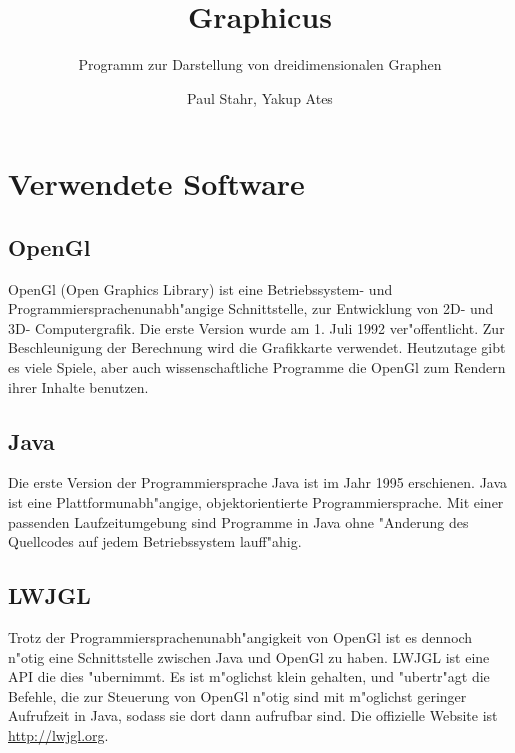 \documentclass{scrartcl}
\title{Graphicus}
\author{Paul Stahr, Yakup Ates}
\subtitle{Programm zur Darstellung von dreidimensionalen Graphen}
\begin{document}
\maketitle
\newpage

\tableofcontents
\newpage
\section{Verwendete Software}
\subsection{OpenGl}
OpenGl (Open Graphics Library) ist eine Betriebssystem- und Programmiersprachenunabh"angige Schnittstelle, zur Entwicklung von 2D- und 3D- Computergrafik. Die erste Version wurde am 1. Juli 1992 ver"offentlicht. Zur Beschleunigung der Berechnung wird die Grafikkarte verwendet. Heutzutage gibt es viele Spiele, aber auch wissenschaftliche Programme die OpenGl zum Rendern ihrer Inhalte benutzen.
\subsection{Java}
Die erste Version der Programmiersprache Java ist im Jahr 1995 erschienen. Java ist eine Plattformunabh"angige, objektorientierte Programmiersprache. Mit einer passenden Laufzeitumgebung sind Programme in Java ohne "Anderung des Quellcodes auf jedem Betriebssystem lauff"ahig.
\subsection{LWJGL}
Trotz der Programmiersprachenunabh"angigkeit von OpenGl ist es dennoch n"otig eine Schnittstelle zwischen Java und OpenGl zu haben. LWJGL ist eine API die dies "ubernimmt. Es ist m"oglichst klein gehalten, und "ubertr"agt die Befehle, die zur Steuerung von OpenGl n"otig sind mit m"oglichst geringer Aufrufzeit in Java, sodass sie dort dann aufrufbar sind. Die offizielle Website ist  \url{http://lwjgl.org}.
\newpage
\end{document}
